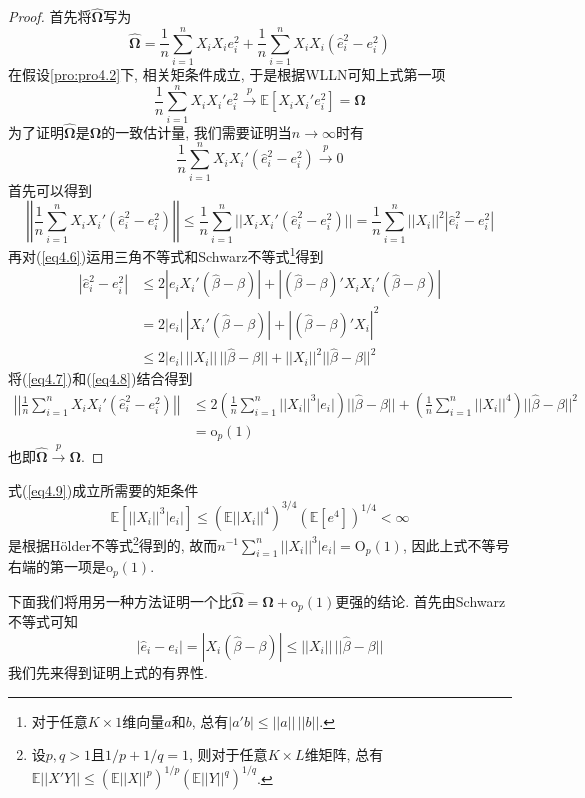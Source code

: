 \documentclass[cn, 12pt, math=mtpro2, bibstyle=apa, blue, twocol]{elegantbook}
\newcommand{\E}{\mathbb{E}}
\newcommand{\hb}{\hat{\beta}}
\begin{document}
\begin{proof}
  首先将$\hat{\mathbold{\Omega}}$写为
  $$\hat{\mathbold{\Omega}}=\frac{1}{n}\sum_{i=1}^{n}X_iX_ie_i^2+\frac{1}{n}\sum_{i=1}^{n}X_iX_i(\hat{e}_i^2-e_i^2)$$
  在假设\ref{pro:pro4.2}下, 相关矩条件成立, 于是根据WLLN可知上式第一项
  $$\frac{1}{n}\sum_{i=1}^{n}X_iX_i'e_i^2\xrightarrow{p}\E[X_iX_i'e_i^2]=\mathbold{\Omega}$$
  为了证明$\hat{\mathbold{\Omega}}$是$\mathbold{\Omega}$的一致估计量, 我们需要证明当$n\to\infty$时有
  $$\frac{1}{n}\sum_{i=1}^{n}X_iX_i'(\hat{e}_i^2-e_i^2)\xrightarrow{p}0$$
  首先可以得到
  \begin{equation}\label{eq4.7}
    \left|\left|\frac{1}{n}\sum_{i=1}^{n}X_iX_i'(\hat{e}_i^2-e_i^2)\right|\right|\leq\frac{1}{n}\sum_{i=1}^{n}||X_iX_i'(\hat{e}_i^2-e_i^2)||=\frac{1}{n}\sum_{i=1}^{n}||X_i||^2|\hat{e}_i^2-e_i^2|
  \end{equation}
  再对(\ref{eq4.6})运用三角不等式和Schwarz不等式\footnote{对于任意$K\times1$维向量$a$和$b$, 总有$|a'b|\leq||a||\,||b||$.}得到
  \begin{align}
  |\hat{e}_i^2-e_i^2|&\leq2|e_iX_i'(\hb-\beta)|+|(\hb-\beta)'X_iX_i'(\hb-\beta)| \nonumber \\
  &=2|e_i|\,|X_i'(\hb-\beta)|+|(\hb-\beta)'X_i|^2 \nonumber \\
  &\leq2|e_i|\,||X_i||\,||\hb-\beta||+||X_i||^2||\hb-\beta||^2 \label{eq4.8}
  \end{align}
  将(\ref{eq4.7})和(\ref{eq4.8})结合得到
  \begin{align}
  \left|\left|\frac{1}{n}\sum_{i=1}^{n}X_iX_i'(\hat{e}_i^2-e_i^2)\right|\right|&\leq2\left(\frac{1}{n}\sum_{i=1}^{n}||X_i||^3|e_i|\right)||\hb-\beta||+\left(\frac{1}{n}\sum_{i=1}^{n}||X_i||^4\right)||\hb-\beta||^2 \nonumber \\
  &=\text{o}_p(1) \label{eq4.9}
  \end{align}
  也即$\hat{\mathbold{\Omega}}\xrightarrow{p}\mathbold{\Omega}$.
\end{proof}
\begin{remark}
式(\ref{eq4.9})成立所需要的矩条件
  $$\E[||X_i||^3|e_i|]\leq(\E||X_i||^4)^{3/4}(\E[e^4])^{1/4}<\infty$$
  是根据H\"{o}lder不等式\footnote{设$p,q>1$且$1/p+1/q=1$, 则对于任意$K\times L$维矩阵, 总有$\E||X'Y||\leq(\E||X||^p)^{1/p}(\E||Y||^q)^{1/q}$.}得到的, 故而$n^{-1}\sum_{i=1}^{n}||X_i||^3|e_i|=\text{O}_p(1)$, 因此上式不等号右端的第一项是$\text{o}_p(1)$.
\end{remark}
下面我们将用另一种方法证明一个比$\hat{\mathbold{\Omega}}=\mathbold{\Omega}+\text{o}_p(1)$更强的结论. 首先由Schwarz不等式可知
\begin{equation}\label{eq4.10}
  |\hat{e}_i-e_i|=|X_i(\hb-\beta)|\leq||X_i||\,||\hb-\beta||
\end{equation}
我们先来得到证明上式的有界性.
\end{document}
